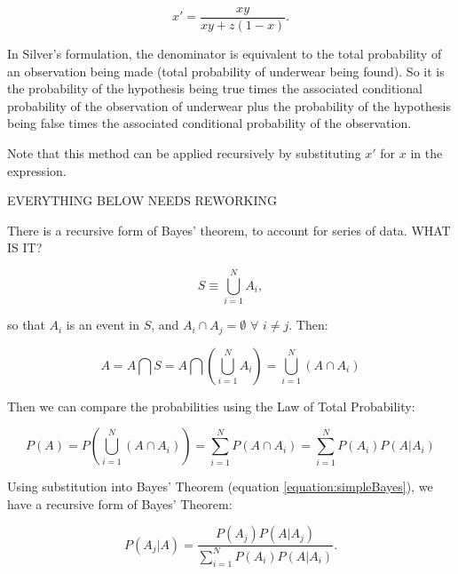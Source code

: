 \begin{equation}
x' = \frac{xy}{xy+z(1-x)}.
\end{equation}

In Silver's formulation, the denominator is equivalent to the total probability of an observation being made (total probability of underwear being found). So it is the probability of the hypothesis being true times the associated conditional probability of the observation of underwear plus the probability of the hypothesis being false times the associated conditional probability of the observation.

Note that this method can be applied recursively by substituting $x'$ for $x$ in the expression. 


EVERYTHING BELOW NEEDS REWORKING

There is a recursive form of Bayes' theorem, to account for series of data. WHAT IS IT?

\begin{equation}
S \equiv \bigcup_{i=1}^{N} A_{i},
\end{equation}

so that $A_{i}$ is an event in $S$, and $A_{i} \cap A_{j} = \emptyset$ $\forall$ $i \not= j$. Then:

\begin{equation}
A = A \bigcap S = A \bigcap ( \bigcup_{i=1}^{N} A_{i} ) = \bigcup_{i=1}^{N} (A \cap A_{i})
\end{equation}

Then we can compare the probabilities using the Law of Total Probability:

\begin{equation}
P(A) = P(\bigcup_{i=1}^{N} (A \cap A_{i}))=\sum_{i=1}^{N} P(A \cap A_{i}) = \sum_{i=1}^{N} P(A_{i}) P(A|A_{i})
\end{equation}

Using substitution into Bayes' Theorem (equation \ref{equation:simpleBayes}), we have a recursive form of Bayes' Theorem:

\begin{equation}
P(A_{j} | A) = \frac{P(A_{j}) P(A | A_{j})}{\sum_{i=1}^{N} P(A_{i}) P(A|A_{i})}.
\end{equation}

